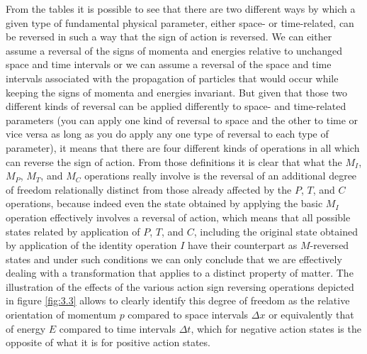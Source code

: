 \documentclass[notitlepage,12pt]{report}
\begin{document}
From the tables it is possible to see that there are two different ways by which a given type of fundamental physical parameter, either space- or time-related, can be reversed in such a way that the sign of action is reversed. We can either assume a reversal of the signs of momenta and energies relative to unchanged space and time intervals or we can assume a reversal of the space and time intervals associated with the propagation of particles that would occur while keeping the signs of momenta and energies invariant. But given that those two different kinds of reversal can be applied differently to space- and time-related parameters (you can apply one kind of reversal to space and the other to time or vice versa as long as you do apply any one type of reversal to each type of parameter), it means that there are four different kinds of operations in all which can reverse the sign of action. From those definitions it is clear that what the $M_I$, $M_P$, $M_T$, and $M_C$ operations really involve is the reversal of an additional degree of freedom relationally distinct from those already affected by the $P$, $T$, and $C$ operations, because indeed even the state obtained by applying the basic $M_I$ operation effectively involves a reversal of action, which means that all possible states related by application of $P$, $T$, and $C$, including the original state obtained by application of the identity operation $I$ have their counterpart as $M$-reversed states and under such conditions we can only conclude that we are effectively dealing with a transformation that applies to a distinct property of matter. The illustration of the effects of the various action sign reversing operations depicted in figure \ref{fig:3.3} allows to clearly identify this degree of freedom as the relative orientation of momentum $p$ compared to space intervals $\Delta x$ or equivalently that of energy $E$ compared to time intervals $\Delta t$, which for negative action states is the opposite of what it is for positive action states.
\end{document}
